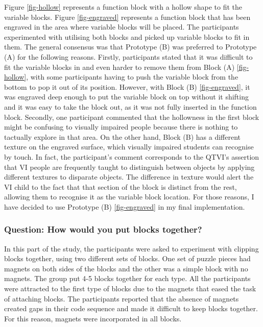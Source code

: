 \documentclass[oneside,%
                    author={Malak Hajji},
                    degree={BSc},
                    title={Designing An Accessible Computational Toolkit For Students},
                  subtitle={With Mixed Visual Abilities}]{dissertation}
\begin{document}
Figure \ref{fig-hollow} represents a function block with a hollow shape to fit the variable blocks. Figure \ref{fig-engraved} represents a function block that has been engraved in the area where variable blocks will be placed. 
The participants experimented with utilising both blocks and picked up variable blocks to fit in them. 
The general consensus was that Prototype (B) was preferred to Prototype (A) for the following reasons. Firstly, participants stated that it was difficult to fit the variable blocks in and even harder to remove them from Block (A) \ref{fig-hollow}, with some participants having to push the variable block from the bottom to pop it out of its position. However, with Block (B) \ref{fig-engraved}, it was engraved deep enough to put the variable block on top without it shifting and it was easy to take the block out, as it was not fully inserted in the function block. Secondly, one participant commented that the hollowness in the first block might be confusing to visually impaired people because there is nothing to tactually explore in that area. On the other hand, Block (B) has a different texture on the engraved surface, which visually impaired students can recognise by touch. In fact, the participant's comment corresponds to the QTVI's assertion that VI people are frequently taught to distinguish between objects by applying different textures to disparate objects. The difference in texture would alert the VI child to the fact that that section of the block is distinct from the rest, allowing them to recognise it as the variable block location.
For those reasons, I have decided to use Prototype (B) \ref{fig-engraved} in my final implementation.

\subsubsection{Question: How would you put blocks together?}
In this part of the study, the participants were asked to experiment with clipping blocks together, using two different sets of blocks. One set of puzzle pieces had magnets on both sides of the blocks and the other was a simple block with no magnets.
The group put 4-5 blocks together for each type.
All the participants were attracted to the first type of blocks due to the magnets that eased the task of attaching blocks. The participants reported that the absence of magnets created gaps in their code sequence and made it difficult to keep blocks together. For this reason, magnets were incorporated in all blocks.
\end{document}
